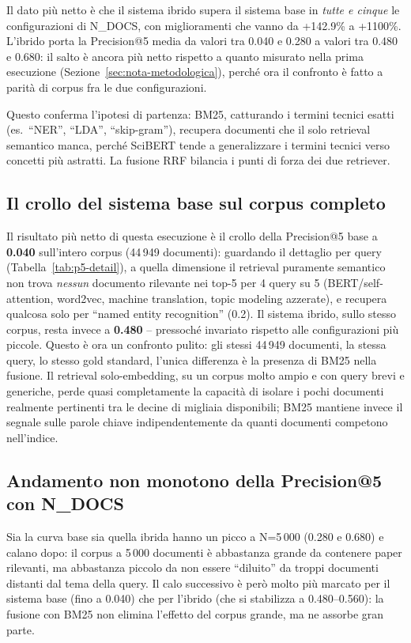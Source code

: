 \documentclass[12pt,a4paper]{article}
\begin{document}
Il dato pi\`u netto \`e che il sistema ibrido supera il sistema base in \textit{tutte e cinque} le configurazioni di N\_DOCS, con miglioramenti che vanno da +142.9\% a +1100\%. L'ibrido porta la Precision@5 media da valori tra 0.040 e 0.280 a valori tra 0.480 e 0.680: il salto \`e ancora pi\`u netto rispetto a quanto misurato nella prima esecuzione (Sezione~\ref{sec:nota-metodologica}), perch\'e ora il confronto \`e fatto a parit\`a di corpus fra le due configurazioni.

Questo conferma l'ipotesi di partenza: BM25, catturando i termini tecnici esatti (es.\ ``NER'', ``LDA'', ``skip-gram''), recupera documenti che il solo retrieval semantico manca, perch\'e SciBERT tende a generalizzare i termini tecnici verso concetti pi\`u astratti. La fusione RRF bilancia i punti di forza dei due retriever.

\subsection{Il crollo del sistema base sul corpus completo}
\label{subsec:crollo-base}

Il risultato pi\`u netto di questa esecuzione \`e il crollo della Precision@5 base a \textbf{0.040} sull'intero corpus (44\,949 documenti): guardando il dettaglio per query (Tabella~\ref{tab:p5-detail}), a quella dimensione il retrieval puramente semantico non trova \emph{nessun} documento rilevante nei top-5 per 4 query su 5 (BERT/self-attention, word2vec, machine translation, topic modeling azzerate), e recupera qualcosa solo per ``named entity recognition'' (0.2). Il sistema ibrido, sullo stesso corpus, resta invece a \textbf{0.480} -- pressoch\'e invariato rispetto alle configurazioni pi\`u piccole. Questo \`e ora un confronto pulito: gli stessi 44\,949 documenti, la stessa query, lo stesso gold standard, l'unica differenza \`e la presenza di BM25 nella fusione. Il retrieval solo-embedding, su un corpus molto ampio e con query brevi e generiche, perde quasi completamente la capacit\`a di isolare i pochi documenti realmente pertinenti tra le decine di migliaia disponibili; BM25 mantiene invece il segnale sulle parole chiave indipendentemente da quanti documenti competono nell'indice.

\subsection{Andamento non monotono della Precision@5 con N\_DOCS}

Sia la curva base sia quella ibrida hanno un picco a N=5\,000 (0.280 e 0.680) e calano dopo: il corpus a 5\,000 documenti \`e abbastanza grande da contenere paper rilevanti, ma abbastanza piccolo da non essere ``diluito'' da troppi documenti distanti dal tema della query. Il calo successivo \`e per\`o molto pi\`u marcato per il sistema base (fino a 0.040) che per l'ibrido (che si stabilizza a 0.480--0.560): la fusione con BM25 non elimina l'effetto del corpus grande, ma ne assorbe gran parte.
\end{document}
